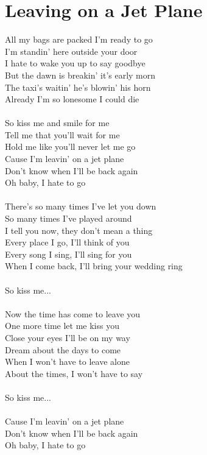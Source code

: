 \section{Leaving on a Jet Plane}
All my bags are packed I'm ready to go\\
I'm standin' here outside your door\\
I hate to wake you up to say goodbye\\
But the dawn is breakin' it's early morn\\
The taxi's waitin' he's blowin' his horn\\
Already I'm so lonesome I could die\\
\\
So kiss me and smile for me\\
Tell me that you'll wait for me\\
Hold me like you'll never let me go\\
Cause I'm leavin' on a jet plane\\
Don't know when I'll be back again\\
Oh baby, I hate to go\\
\\
There's so many times I've let you down\\
So many times I've played around\\
I tell you now, they don't mean a thing\\
Every place I go, I'll think of you\\
Every song I sing, I'll sing for you\\
When I come back, I'll bring your wedding ring\\
\\
So kiss me...\\
\\
Now the time has come to leave you\\
One more time let me kiss you\\
Close your eyes I'll be on my way\\
Dream about the days to come\\
When I won't have to leave alone\\
About the times, I won't have to say\\
\\
So kiss me...\\
\\
Cause I'm leavin' on a jet plane\\
Don't know when I'll be back again\\
Oh baby, I hate to go \\
